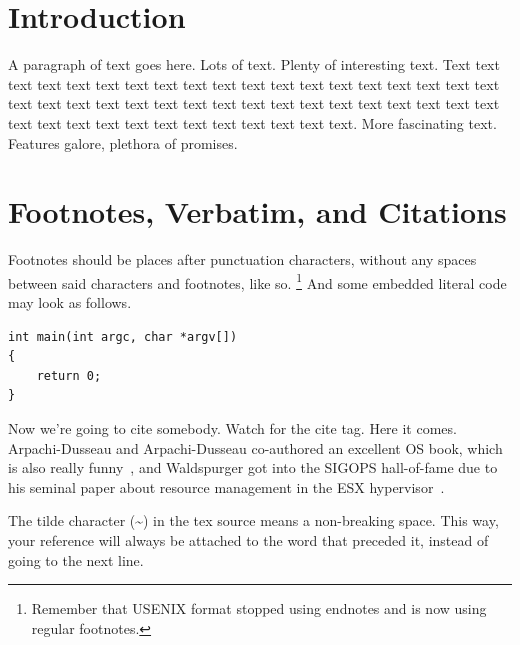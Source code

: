 \begin{abstract}
Your abstract text goes here. Just a few facts. Whet our appetites.
Not more than 200 words, if possible, and preferably closer to 150.
\end{abstract}


\section{Introduction}

A paragraph of text goes here. Lots of text. Plenty of interesting
text. Text text text text text text text text text text text text text
text text text text text text text text text text text text text text
text text text text text text text text text text text text text text
text text text text text text text.
More fascinating text. Features galore, plethora of promises.

\section{Footnotes, Verbatim, and Citations}

Footnotes should be places after punctuation characters, without any
spaces between said characters and footnotes, like so.%
\footnote{Remember that USENIX format stopped using endnotes and is
  now using regular footnotes.} And some embedded literal code may
look as follows.

\begin{verbatim}
int main(int argc, char *argv[]) 
{
    return 0;
}
\end{verbatim}

Now we're going to cite somebody. Watch for the cite tag. Here it
comes. Arpachi-Dusseau and Arpachi-Dusseau co-authored an excellent OS
book, which is also really funny~\cite{arpachiDusseau18:osbook}, and
Waldspurger got into the SIGOPS hall-of-fame due to his seminal paper
about resource management in the ESX hypervisor~\cite{waldspurger02}.

The tilde character (\~{}) in the tex source means a non-breaking
space. This way, your reference will always be attached to the word
that preceded it, instead of going to the next line.

